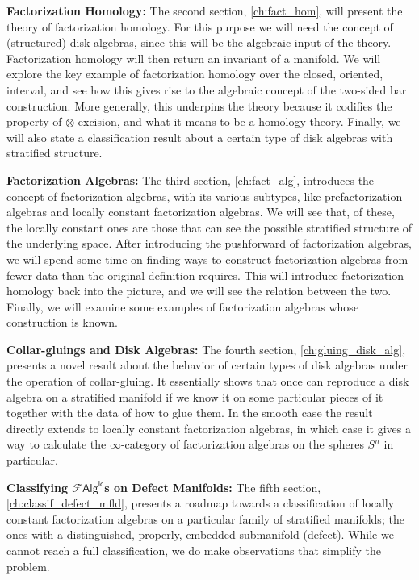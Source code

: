 \documentclass[12pt,a4paper]{article}
\theoremstyle{definition}
\theoremstyle{plain}
\theoremstyle{remark}
\newcommand{\lcfa}{\mathscr{F} \mathsf{Alg}^{\mathsf{lc}}}
\begin{document}
\textbf{Factorization Homology:} The second section, \cref{ch:fact_hom}, will present the theory of factorization homology. For this purpose we will need the concept of (structured) disk algebras, since this will be the algebraic input of the theory. Factorization homology will then return an invariant of a manifold. We will explore the key example of factorization homology over the closed, oriented, interval, and see how this gives rise to the algebraic concept of the two-sided bar construction. More generally, this underpins the theory because it codifies the property of $\otimes$-excision, and what it means to be a homology theory. Finally, we will also state a classification result about a certain type of disk algebras with stratified structure.

\textbf{Factorization Algebras:} The third section, \cref{ch:fact_alg}, introduces the concept of factorization algebras, with its various subtypes, like prefactorization algebras and locally constant factorization algebras. We will see that, of these, the locally constant ones are those that can see the possible stratified structure of the underlying space. After introducing the pushforward of factorization algebras, we will spend some time on finding ways to construct factorization algebras from fewer data than the original definition requires. This will introduce factorization homology back into the picture, and we will see the relation between the two. Finally, we will examine some examples of factorization algebras whose construction is known.

\textbf{Collar-gluings and Disk Algebras:} The fourth section, \cref{ch:gluing_disk_alg}, presents a novel result about the behavior of certain types of disk algebras under the operation of collar-gluing. It essentially shows that once can reproduce a disk algebra on a stratified manifold if we know it on some particular pieces of it together with the data of how to glue them. In the smooth case the result directly extends to locally constant factorization algebras, in which case it gives a way to calculate the $\infty$-category of factorization algebras on the spheres $S^n$ in particular.

\textbf{Classifying $\lcfa$s on Defect Manifolds:} The fifth section, \cref{ch:classif_defect_mfld}, presents a roadmap towards a classification of locally constant factorization algebras on a particular family of stratified manifolds; the ones with a distinguished, properly, embedded submanifold (defect). While we cannot reach a full classification, we do make observations that simplify the problem.
\end{document}

